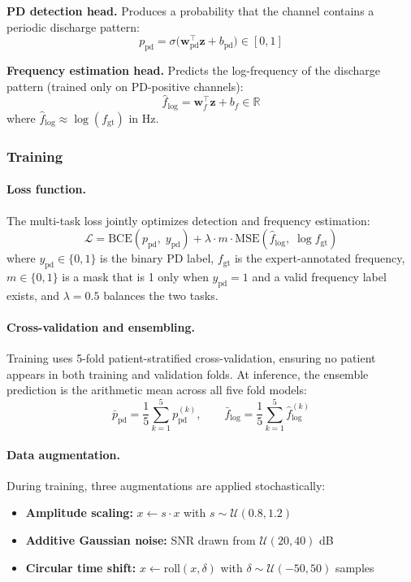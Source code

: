 \textbf{PD detection head.} Produces a probability that the channel contains a periodic discharge pattern:
\[ p_{\mathrm{pd}} = \sigma\!\big(\mathbf{w}_{\mathrm{pd}}^{\top} \mathbf{z} + b_{\mathrm{pd}}\big) \in [0, 1] \tag{8} \]

\textbf{Frequency estimation head.} Predicts the log-frequency of the discharge pattern (trained only on PD-positive channels):
\[ \hat{f}_{\log} = \mathbf{w}_f^{\top} \mathbf{z} + b_f \in \mathbb{R} \tag{9} \]
where $\hat{f}_{\log} \approx \log(f_{\mathrm{gt}})$ in Hz.

\subsubsection{Training}

\paragraph{Loss function.}
The multi-task loss jointly optimizes detection and frequency estimation:
\[ \mathcal{L} = \mathrm{BCE}(p_{\mathrm{pd}},\; y_{\mathrm{pd}}) + \lambda \cdot m \cdot \mathrm{MSE}(\hat{f}_{\log},\; \log f_{\mathrm{gt}}) \tag{10} \]
where $y_{\mathrm{pd}} \in \{0, 1\}$ is the binary PD label, $f_{\mathrm{gt}}$ is the expert-annotated frequency, $m \in \{0, 1\}$ is a mask that is 1 only when $y_{\mathrm{pd}} = 1$ and a valid frequency label exists, and $\lambda = 0.5$ balances the two tasks.

\paragraph{Cross-validation and ensembling.}
Training uses 5-fold patient-stratified cross-validation, ensuring no patient appears in both training and validation folds. At inference, the ensemble prediction is the arithmetic mean across all five fold models:
\[ \bar{p}_{\mathrm{pd}} = \frac{1}{5} \sum_{k=1}^{5} p_{\mathrm{pd}}^{(k)}, \qquad \bar{f}_{\log} = \frac{1}{5} \sum_{k=1}^{5} \hat{f}_{\log}^{(k)} \tag{11} \]

\paragraph{Data augmentation.}
During training, three augmentations are applied stochastically:
\begin{itemize}
  \item \textbf{Amplitude scaling:} $x \leftarrow s \cdot x$ with $s \sim \mathcal{U}(0.8, 1.2)$
  \item \textbf{Additive Gaussian noise:} SNR drawn from $\mathcal{U}(20, 40)$ dB
  \item \textbf{Circular time shift:} $x \leftarrow \mathrm{roll}(x, \delta)$ with $\delta \sim \mathcal{U}(-50, 50)$ samples
\end{itemize}


